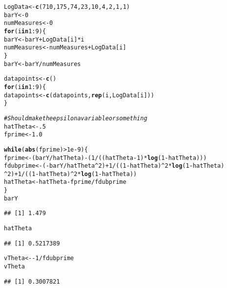 \documentclass[10pt]{paper}\usepackage[]{graphicx}\usepackage[]{color}
\makeatletter
\newcommand{\hlnum}[1]{\textcolor[rgb]{0.686,0.059,0.569}{#1}}%
\newcommand{\hlcom}[1]{\textcolor[rgb]{0.678,0.584,0.686}{\textit{#1}}}%
\newcommand{\hlopt}[1]{\textcolor[rgb]{0,0,0}{#1}}%
\newcommand{\hlstd}[1]{\textcolor[rgb]{0.345,0.345,0.345}{#1}}%
\newcommand{\hlkwa}[1]{\textcolor[rgb]{0.161,0.373,0.58}{\textbf{#1}}}%
\newcommand{\hlkwb}[1]{\textcolor[rgb]{0.69,0.353,0.396}{#1}}%
\newcommand{\hlkwd}[1]{\textcolor[rgb]{0.737,0.353,0.396}{\textbf{#1}}}%
\newenvironment{kframe}{%
 \def\at@end@of@kframe{}%
 \ifinner\ifhmode%
  \def\at@end@of@kframe{\end{minipage}}%
  \begin{minipage}{\columnwidth}%
 \fi\fi%
 \def\FrameCommand##1{\hskip\@totalleftmargin \hskip-\fboxsep
 \colorbox{shadecolor}{##1}\hskip-\fboxsep
     \hskip-\linewidth \hskip-\@totalleftmargin \hskip\columnwidth}%
 \MakeFramed {\advance\hsize-\width
   \@totalleftmargin\z@ \linewidth\hsize
   \@setminipage}}%
 {\par\unskip\endMakeFramed%
 \at@end@of@kframe}
\newenvironment{knitrout}{}{} %
\makeatother
\begin{document}
\begin{knitrout}
\color{fgcolor}\begin{kframe}
\begin{alltt}
\hlstd{LogData} \hlkwb{<-} \hlkwd{c}\hlstd{(} \hlnum{710}\hlstd{,} \hlnum{175}\hlstd{,} \hlnum{74}\hlstd{,} \hlnum{23}\hlstd{,} \hlnum{10}\hlstd{,} \hlnum{4}\hlstd{,} \hlnum{2}\hlstd{,} \hlnum{1}\hlstd{,} \hlnum{1}\hlstd{)}
\hlstd{barY} \hlkwb{<-} \hlnum{0}
\hlstd{numMeasures} \hlkwb{<-} \hlnum{0}
\hlkwa{for}\hlstd{( i} \hlkwa{in} \hlnum{1}\hlopt{:}\hlnum{9}\hlstd{)\{}
 \hlstd{barY} \hlkwb{<-} \hlstd{barY} \hlopt{+} \hlstd{LogData[i]}\hlopt{*}\hlstd{i}
 \hlstd{numMeasures} \hlkwb{<-} \hlstd{numMeasures} \hlopt{+} \hlstd{LogData[i]}
\hlstd{\}}
\hlstd{barY} \hlkwb{<-} \hlstd{barY} \hlopt{/} \hlstd{numMeasures}

\hlstd{datapoints} \hlkwb{<-} \hlkwd{c}\hlstd{()}
\hlkwa{for}\hlstd{( i} \hlkwa{in} \hlnum{1}\hlopt{:}\hlnum{9} \hlstd{)\{}
    \hlstd{datapoints} \hlkwb{<-} \hlkwd{c}\hlstd{( datapoints,} \hlkwd{rep}\hlstd{( i, LogData[i] ) )}
\hlstd{\}}

\hlcom{#Should make the epsilon a variable or something}
\hlstd{hatTheta} \hlkwb{<-} \hlnum{.5}
\hlstd{fprime} \hlkwb{<-} \hlnum{1.0}

\hlkwa{while}\hlstd{(} \hlkwd{abs}\hlstd{( fprime )} \hlopt{>} \hlnum{1e-9}\hlstd{) \{}
 \hlstd{fprime} \hlkwb{<-} \hlstd{(barY} \hlopt{/} \hlstd{hatTheta)} \hlopt{-} \hlstd{(}\hlnum{1} \hlopt{/} \hlstd{((hatTheta}\hlopt{-}\hlnum{1}\hlstd{)}\hlopt{*}\hlkwd{log}\hlstd{(} \hlnum{1}\hlopt{-} \hlstd{hatTheta)))}
 \hlstd{fdubprime} \hlkwb{<-} \hlstd{(} \hlopt{-}\hlstd{barY} \hlopt{/} \hlstd{hatTheta}\hlopt{^}\hlnum{2} \hlstd{)}\hlopt{+} \hlnum{1} \hlopt{/} \hlstd{((}\hlnum{1}\hlopt{-}\hlstd{hatTheta)}\hlopt{^}\hlnum{2} \hlopt{*} \hlkwd{log}\hlstd{(} \hlnum{1} \hlopt{-} \hlstd{hatTheta )}
\hlopt{^}\hlnum{2} \hlstd{)} \hlopt{+} \hlnum{1} \hlopt{/} \hlstd{((}\hlnum{1}\hlopt{-}\hlstd{hatTheta)}\hlopt{^}\hlnum{2} \hlopt{*} \hlkwd{log}\hlstd{(} \hlnum{1}\hlopt{-} \hlstd{hatTheta ) )}
 \hlstd{hatTheta} \hlkwb{<-} \hlstd{hatTheta} \hlopt{-} \hlstd{fprime} \hlopt{/} \hlstd{fdubprime}
\hlstd{\}}
\hlstd{barY}
\end{alltt}
\begin{verbatim}
## [1] 1.479
\end{verbatim}
\begin{alltt}
\hlstd{hatTheta}
\end{alltt}
\begin{verbatim}
## [1] 0.5217389
\end{verbatim}
\begin{alltt}
\hlstd{vTheta} \hlkwb{<-} \hlopt{-}\hlnum{1} \hlopt{/} \hlstd{fdubprime}
\hlstd{vTheta}
\end{alltt}
\begin{verbatim}
## [1] 0.3007821
\end{verbatim}
\end{kframe}
\end{knitrout}
\end{document}
